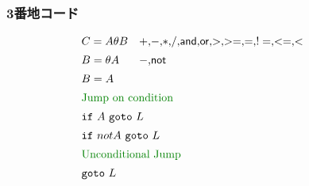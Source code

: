 \documentclass[dvipdfmx,cjk]{beamer}
\begin{document}
\begin{frame}
 \frametitle{3番地コード}
 \[
 \begin{array}{lp{.5\textwidth}}
  C = A\theta B & $+$,$-$,$*$,$/$,$\mathsf{and}$,$\mathsf{or}$,$>$,$>=$,$=$,$!=$,$<=$,$<$\\[5pt]
  B = \theta A & $-$,$\mathsf{not}$\\[5pt]
  B = A\\[5pt]
  \multicolumn{2}{l}{\mbox{\greentext{Jump on condition}}}\\[5pt]
  \multicolumn{2}{l}{\mathtt{if}\ A\ \mathtt{goto}\ L}\\[5pt]
  \multicolumn{2}{l}{\mathtt{if}\ not A\ \mathtt{goto}\ L}\\[5pt]
  \multicolumn{2}{l}{\mbox{\greentext{Unconditional Jump}}}\\[5pt]
  \multicolumn{2}{l}{\mathtt{goto}\ L}
 \end{array}
 \]
\end{frame}
\end{document}
